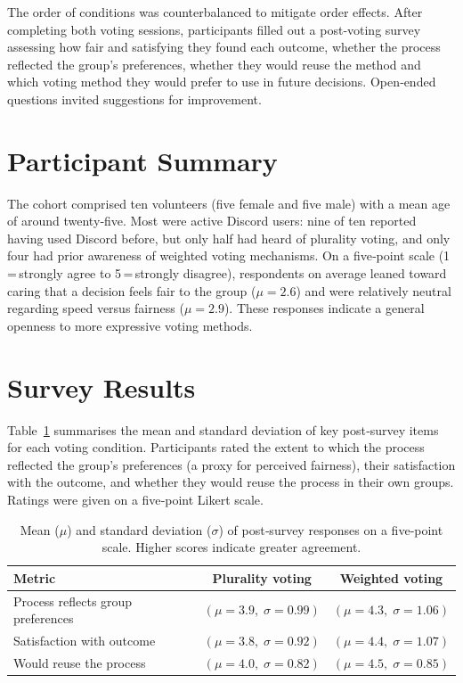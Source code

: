 The order of conditions was counterbalanced to mitigate order effects.  After completing both voting sessions, participants filled out a post‑voting survey assessing how fair and satisfying they found each outcome, whether the process reflected the group’s preferences, whether they would reuse the method and which voting method they would prefer to use in future decisions.  Open‑ended questions invited suggestions for improvement.

\section{Participant Summary}

The cohort comprised ten volunteers (five female and five male) with a mean age of around twenty‑five.  Most were active Discord users: nine of ten reported having used Discord before, but only half had heard of plurality voting, and only four had prior awareness of weighted voting mechanisms.  On a five‑point scale (1\,=\,strongly agree to 5\,=\,strongly disagree), respondents on average leaned toward caring that a decision feels fair to the group ($\mu = 2.6$) and were relatively neutral regarding speed versus fairness ($\mu = 2.9$).  These responses indicate a general openness to more expressive voting methods.

\section{Survey Results}

Table~\ref{tab:survey-results} summarises the mean and standard deviation of key post‑survey items for each voting condition.  Participants rated the extent to which the process reflected the group’s preferences (a proxy for perceived fairness), their satisfaction with the outcome, and whether they would reuse the process in their own groups.  Ratings were given on a five‑point Likert scale.

\begin{table}[h]
    \centering
    \caption{Mean ($\mu$) and standard deviation ($\sigma$) of post‑survey responses on a five‑point scale.  Higher scores indicate greater agreement.}
    \label{tab:survey-results}
    \begin{tabular}{lcc}
        \toprule
        \textbf{Metric} & \textbf{Plurality voting} & \textbf{Weighted voting} \\ \midrule
        Process reflects group preferences & $(\mu=3.9,\;\sigma=0.99)$ & $(\mu=4.3,\;\sigma=1.06)$ \\
        Satisfaction with outcome & $(\mu=3.8,\;\sigma=0.92)$ & $(\mu=4.4,\;\sigma=1.07)$ \\
        Would reuse the process & $(\mu=4.0,\;\sigma=0.82)$ & $(\mu=4.5,\;\sigma=0.85)$ \\ \bottomrule
    \end{tabular}
\end{table}

